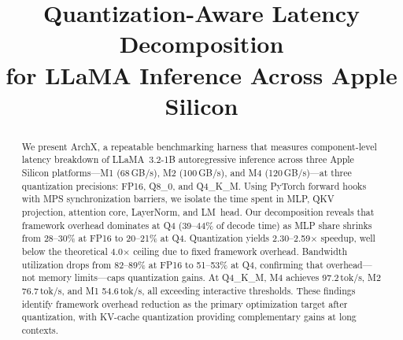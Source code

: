\documentclass[conference]{IEEEtran}
\begin{document}
\title{Quantization-Aware Latency Decomposition\\for LLaMA Inference Across Apple Silicon}

\author{
}

\maketitle

\begin{abstract}
We present ArchX, a repeatable benchmarking harness that measures component-level latency breakdown of LLaMA~3.2-1B autoregressive inference across three Apple Silicon platforms---M1 (68\,GB/s), M2 (100\,GB/s), and M4 (120\,GB/s)---at three quantization precisions: FP16, Q8\_0, and Q4\_K\_M. Using PyTorch forward hooks with MPS synchronization barriers, we isolate the time spent in MLP, QKV projection, attention core, LayerNorm, and LM~head. Our decomposition reveals that framework overhead dominates at Q4 (39--44\% of decode time) as MLP share shrinks from 28--30\% at FP16 to 20--21\% at Q4. Quantization yields 2.30--2.59$\times$ speedup, well below the theoretical 4.0$\times$ ceiling due to fixed framework overhead. Bandwidth utilization drops from 82--89\% at FP16 to 51--53\% at Q4, confirming that overhead---not memory limits---caps quantization gains. At Q4\_K\_M, M4 achieves 97.2\,tok/s, M2 76.7\,tok/s, and M1 54.6\,tok/s, all exceeding interactive thresholds. These findings identify framework overhead reduction as the primary optimization target after quantization, with KV-cache quantization providing complementary gains at long contexts.
\end{abstract}

\end{document}
